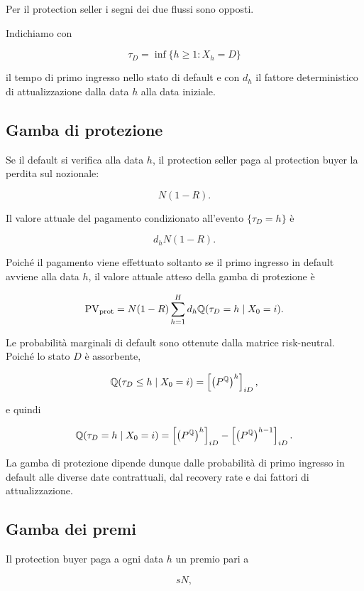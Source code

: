 Per il protection seller i segni dei due flussi sono opposti.

Indichiamo con

\[
\tau_D
=
\inf\{h\geq1:X_h=D\}
\]

il tempo di primo ingresso nello stato di default e con $d_h$ il
fattore deterministico di attualizzazione dalla data $h$ alla data
iniziale.

\subsection{Gamba di protezione}

\label{subsec:cap9-cds-protezione}

Se il default si verifica alla data $h$, il protection seller paga al
protection buyer la perdita sul nozionale:

\[
N(1-R).
\]

Il valore attuale del pagamento condizionato all'evento
$\{\tau_D=h\}$ \`{e}

\[
d_hN(1-R).
\]

Poich\'{e} il pagamento viene effettuato soltanto se il primo ingresso
in default avviene alla data $h$, il valore attuale atteso della gamba
di protezione \`{e}

\[
\mathrm{PV}_{\mathrm{prot}}
=
N(1-R)
\sum_{h=1}^{H}
d_h
\mathbb{Q}(\tau_D=h\mid X_0=i).
\]

Le probabilit\`{a} marginali di default sono ottenute dalla matrice
risk-neutral. Poich\'{e} lo stato $D$ \`{e} assorbente,

\[
\mathbb{Q}(\tau_D\leq h\mid X_0=i)
=
\left[
\left(P^{\mathbb{Q}}\right)^h
\right]_{iD},
\]

e quindi

\[
\mathbb{Q}(\tau_D=h\mid X_0=i)
=
\left[
\left(P^{\mathbb{Q}}\right)^h
\right]_{iD}
-
\left[
\left(P^{\mathbb{Q}}\right)^{h-1}
\right]_{iD}.
\]

La gamba di protezione dipende dunque dalle probabilit\`{a} di primo
ingresso in default alle diverse date contrattuali, dal recovery rate
e dai fattori di attualizzazione.

\subsection{Gamba dei premi}

\label{subsec:cap9-cds-premi}

Il protection buyer paga a ogni data $h$ un premio pari a

\[
sN,
\]

